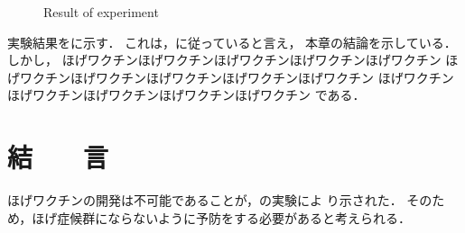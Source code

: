 \begin{small}
\begin{figure}[tbp]
\begin{center}
\caption{Result of experiment}
\end{center}
\end{figure}

実験結果をに示す．
これは，に従っていると言え，
本章の結論を示している．
しかし，
ほげワクチンほげワクチンほげワクチンほげワクチンほげワクチン
ほげワクチンほげワクチンほげワクチンほげワクチンほげワクチン
ほげワクチンほげワクチンほげワクチンほげワクチンほげワクチン
である．


\section{結　　言}
ほげワクチンの開発は不可能であることが，の実験によ
り示された．
%
そのため，ほげ症候群にならないように予防をする必要があると考えられる．

{
\small
 \setlength{\kanjiskip}{0.0zw plus.01zw} %
 \setlength{\baselineskip}{9pt}        %
 \setlength{\itemsep}{0.2pt}             %
 \setlength{\lineskip}{0pt}              %


}



\end{small}

